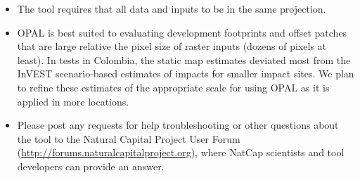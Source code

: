 \documentclass[11pt,letterpaper]{report}
\begin{document}
	\begin{itemize}
		\item The tool requires that all data and inputs to be in the same projection. 
		
		\item OPAL is best suited to evaluating development footprints and offset patches that are large relative the pixel size of raster inputs (dozens of pixels at least). In tests in Colombia, the static map estimates deviated most from the InVEST scenario-based estimates of impacts for smaller impact sites. We plan to refine these estimates of the appropriate scale for using OPAL as it is applied in more locations.
		
		\item Please post any requests for help troubleshooting or other questions about the tool to the Natural Capital Project User Forum (\url{http://forums.naturalcapitalproject.org}), where NatCap scientists and tool developers can provide an answer.
	\end{itemize}
\end{document}
